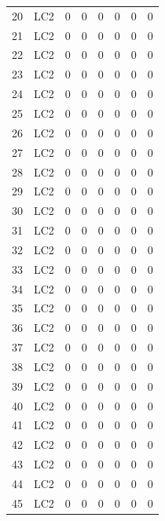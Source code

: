 \documentclass{article}%
\begin{document}
\begin{longtable}{| c c | c c c c c c |}
20&LC2&0&0&0&0&0&0\\%
21&LC2&0&0&0&0&0&0\\%
22&LC2&0&0&0&0&0&0\\%
23&LC2&0&0&0&0&0&0\\%
24&LC2&0&0&0&0&0&0\\%
25&LC2&0&0&0&0&0&0\\%
26&LC2&0&0&0&0&0&0\\%
27&LC2&0&0&0&0&0&0\\%
28&LC2&0&0&0&0&0&0\\%
29&LC2&0&0&0&0&0&0\\%
30&LC2&0&0&0&0&0&0\\%
31&LC2&0&0&0&0&0&0\\%
32&LC2&0&0&0&0&0&0\\%
33&LC2&0&0&0&0&0&0\\%
34&LC2&0&0&0&0&0&0\\%
35&LC2&0&0&0&0&0&0\\%
36&LC2&0&0&0&0&0&0\\%
37&LC2&0&0&0&0&0&0\\%
38&LC2&0&0&0&0&0&0\\%
39&LC2&0&0&0&0&0&0\\%
40&LC2&0&0&0&0&0&0\\%
41&LC2&0&0&0&0&0&0\\%
42&LC2&0&0&0&0&0&0\\%
43&LC2&0&0&0&0&0&0\\%
44&LC2&0&0&0&0&0&0\\%
45&LC2&0&0&0&0&0&0\\%
\end{longtable}%
\end{document}
